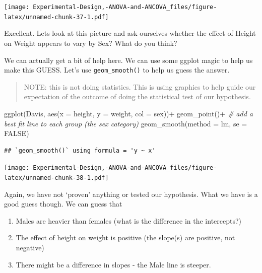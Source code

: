 \documentclass[
]{book}
\newenvironment{Shaded}{\begin{snugshade}}{\end{snugshade}}
\newcommand{\AttributeTok}[1]{\textcolor[rgb]{0.77,0.63,0.00}{#1}}
\newcommand{\CommentTok}[1]{\textcolor[rgb]{0.56,0.35,0.01}{\textit{#1}}}
\newcommand{\ConstantTok}[1]{\textcolor[rgb]{0.00,0.00,0.00}{#1}}
\newcommand{\FunctionTok}[1]{\textcolor[rgb]{0.00,0.00,0.00}{#1}}
\newcommand{\NormalTok}[1]{#1}
\newcommand{\SpecialCharTok}[1]{\textcolor[rgb]{0.00,0.00,0.00}{#1}}
\providecommand{\tightlist}{%
  \setlength{\itemsep}{0pt}\setlength{\parskip}{0pt}}
\begin{document}
\texttt{[image: Experimental-Design,-ANOVA-and-ANCOVA\_files/figure-latex/unnamed-chunk-37-1.pdf]}

Excellent. Lets look at this picture and ask ourselves whether the effect of Height on Weight appears to vary by Sex? What do you think?

We can actually get a bit of help here. We can use some ggplot magic to help us make this GUESS. Let's use \texttt{geom\_smooth()} to help us guess the answer.

\begin{quote}
NOTE: this is not doing statistics. This is using graphics to help guide our expectation of the outcome of doing the statistical test of our hypothesis.
\end{quote}

\begin{Shaded}
\begin{Highlighting}[]
\FunctionTok{ggplot}\NormalTok{(Davis, }\FunctionTok{aes}\NormalTok{(}\AttributeTok{x =}\NormalTok{ height, }\AttributeTok{y =}\NormalTok{ weight, }\AttributeTok{col =}\NormalTok{ sex))}\SpecialCharTok{+}
  \FunctionTok{geom\_point}\NormalTok{()}\SpecialCharTok{+}
  \CommentTok{\# add a best fit line to each group (the sex category)}
  \FunctionTok{geom\_smooth}\NormalTok{(}\AttributeTok{method =}\NormalTok{ lm, }\AttributeTok{se =} \ConstantTok{FALSE}\NormalTok{)}
\end{Highlighting}
\end{Shaded}

\begin{verbatim}
## `geom_smooth()` using formula = 'y ~ x'
\end{verbatim}

\texttt{[image: Experimental-Design,-ANOVA-and-ANCOVA\_files/figure-latex/unnamed-chunk-38-1.pdf]}

Again, we have not `proven' anything or tested our hypothesis. What we have is a good guess though. We can guess that

\begin{enumerate}
\def\labelenumi{\arabic{enumi}.}
\tightlist
\item
  Males are heavier than females (what is the difference in the intercepts?)
\item
  The effect of height on weight is positive (the slope(s) are positive, not negative)
\item
  There might be a difference in slopes - the Male line is steeper.
\end{enumerate}
\end{document}
